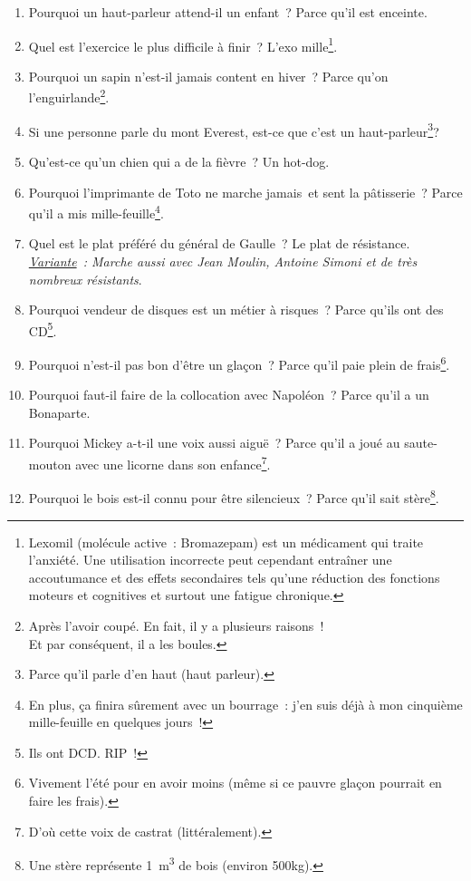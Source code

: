 \documentclass[10pt,a5paper,fullpage]{book}
\begin{document}
\begin{enumerate}
		\item Pourquoi un haut-parleur attend-il un enfant~? Parce qu’il est enceinte.
		\item Quel est l'exercice le plus difficile à finir~? L'exo mille\footnote{Lexomil (molécule active~: Bromazepam) est un médicament qui traite l'anxiété. Une utilisation incorrecte peut cependant entraîner une accoutumance et des effets secondaires tels qu'une réduction des fonctions moteurs et cognitives et surtout une fatigue chronique.}. 
		\item Pourquoi un sapin n’est-il jamais content en hiver~? Parce qu’on l’enguirlande\footnote{Après l'avoir coupé. En fait, il y a plusieurs raisons~!\\Et par conséquent, il a les boules.}.
		\item Si une personne parle du mont Everest, est-ce que c’est un haut-parleur\footnote{Parce qu'il parle d'en haut (haut parleur).}?
		\item Qu'est-ce qu'un chien qui a de la fièvre~? Un hot-dog. 
		\item Pourquoi l’imprimante de Toto ne marche jamais et sent la pâtisserie~? Parce qu’il a mis mille-feuille\footnote{En plus, ça finira sûrement avec un bourrage~: j'en suis déjà à mon cinquième mille-feuille en quelques jours~!}.
		\item Quel est le plat préféré du général de Gaulle~? Le plat de résistance. \\\textit{\underline{Variante}~: Marche aussi avec Jean Moulin, Antoine Simoni et de très nombreux résistants}.
		\item Pourquoi vendeur de disques est un métier à risques~? Parce qu’ils ont des CD\footnote{Ils ont DCD. RIP~!}.
		\item Pourquoi n’est-il pas bon d’être un glaçon~? Parce qu’il paie plein de frais\footnote{Vivement l'été pour en avoir moins (même si ce pauvre glaçon pourrait en faire les frais).}.
		\item Pourquoi faut-il faire de la collocation avec Napoléon~? Parce qu’il a un Bonaparte.
		\item Pourquoi Mickey a-t-il une voix aussi aiguë~? Parce qu’il a joué au saute-mouton avec une licorne dans son enfance\footnote{D'où cette voix de castrat (littéralement).}.	
		\item Pourquoi le bois est-il connu pour être silencieux~? Parce qu’il sait stère\footnote{Une stère représente 1~m\textsuperscript{3} de bois (environ 500kg).}.

\end{enumerate}
\end{document}
